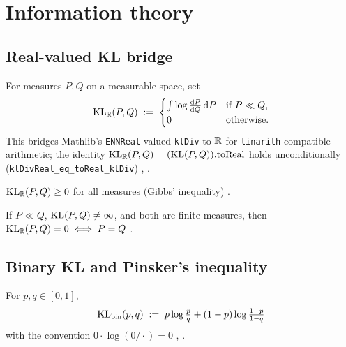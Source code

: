 \chapter{Information theory}\label{chap:information}

\section{Real-valued KL bridge}\label{sec:kl-real}

\begin{defn}
\label{def:kl-div-real}
  \leanok
For measures $P, Q$ on a measurable space, set
\[
  \mathrm{KL}_{\mathbb{R}}(P, Q) \;:=\;
  \begin{cases}
    \int \log \tfrac{\mathrm{d}P}{\mathrm{d}Q}\,\mathrm{d}P & \text{if $P \ll Q$,}\\
    0 & \text{otherwise.}
  \end{cases}
\]
This bridges Mathlib's \texttt{ENNReal}-valued \texttt{klDiv} to $\mathbb{R}$
for \texttt{linarith}-compatible arithmetic; the identity
$\mathrm{KL}_{\mathbb{R}}(P,Q) = (\mathrm{KL}(P,Q)).\mathrm{toReal}$ holds unconditionally
(\texttt{klDivReal\_eq\_toReal\_klDiv})
\cite[\S2.3]{cover-thomas}, \cite[\S2.1]{polyanskiy-wu}.
\end{defn}

\begin{thm}
\label{thm:kl-real-nonneg}
  \leanok
$\mathrm{KL}_{\mathbb{R}}(P, Q) \ge 0$ for all measures (Gibbs' inequality)
\cite[Thm 2.6.3]{cover-thomas}.
\end{thm}

\begin{thm}
\label{thm:kl-real-zero-iff}
  \leanok
If $P \ll Q$, $\mathrm{KL}(P, Q) \ne \infty$, and both are finite measures, then
$\mathrm{KL}_{\mathbb{R}}(P, Q) = 0 \iff P = Q$ \cite[Thm 2.6.3]{cover-thomas}.
\end{thm}

\section{Binary KL and Pinsker's inequality}\label{sec:binary-kl}

\begin{defn}[Binary KL]
\label{def:kl-bin}
  \leanok
For $p, q \in [0, 1]$,
\[
  \mathrm{KL}_\mathrm{bin}(p, q) \;:=\; p \log \tfrac{p}{q} + (1-p) \log \tfrac{1-p}{1-q}
\]
with the convention $0 \cdot \log(0/\cdot) = 0$
\cite[\S2.3, eq.~(2.26)]{cover-thomas}, \cite[\S2.1]{polyanskiy-wu}.
\end{defn}

